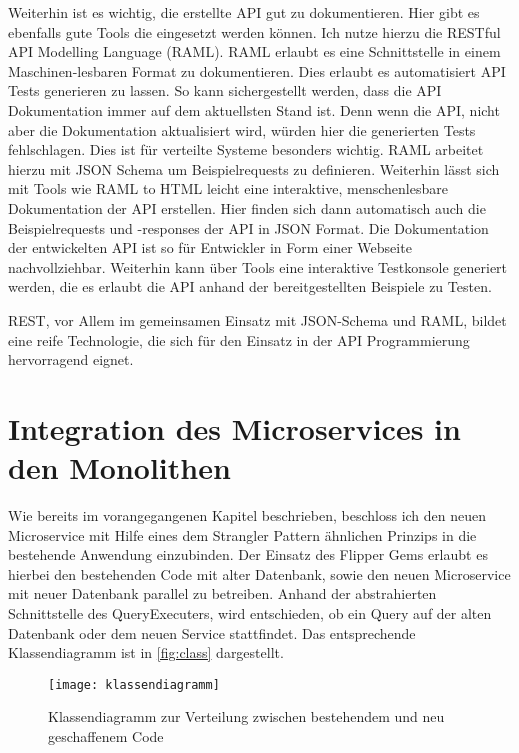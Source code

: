 Weiterhin ist es wichtig, die erstellte API gut zu dokumentieren. Hier gibt es ebenfalls gute Tools die eingesetzt werden können. Ich nutze hierzu die RESTful API Modelling Language (RAML)\cite{raml}. RAML erlaubt es eine Schnittstelle in einem Maschinen-lesbaren Format zu dokumentieren. Dies erlaubt es automatisiert API Tests generieren zu lassen. So kann sichergestellt werden, dass die API Dokumentation immer auf dem aktuellsten Stand ist. Denn wenn die API, nicht aber die Dokumentation aktualisiert wird, würden hier die generierten Tests fehlschlagen. Dies ist für verteilte Systeme besonders wichtig. RAML arbeitet hierzu mit JSON Schema um Beispielrequests zu definieren. Weiterhin lässt sich mit Tools wie RAML to HTML\cite{raml2html} leicht eine interaktive, menschenlesbare Dokumentation der API erstellen. Hier finden sich dann automatisch auch die Beispielrequests und -responses der API in JSON Format. Die Dokumentation der entwickelten API ist so für Entwickler in Form einer Webseite\cite{prophetdoku} nachvollziehbar. 
Weiterhin kann über Tools\cite{ramlconsoletool} eine interaktive Testkonsole generiert werden, die es erlaubt die API anhand der bereitgestellten Beispiele zu Testen.

REST, vor Allem im gemeinsamen Einsatz mit JSON-Schema und RAML, bildet eine reife Technologie, die sich für den Einsatz in der API Programmierung hervorragend eignet.


\section{Integration des Microservices in den Monolithen}
Wie bereits im vorangegangenen Kapitel beschrieben, beschloss ich den neuen Microservice mit Hilfe eines dem Strangler Pattern ähnlichen Prinzips in die bestehende Anwendung einzubinden.
Der Einsatz des Flipper Gems erlaubt es hierbei den bestehenden Code mit alter Datenbank, sowie den neuen Microservice mit neuer Datenbank parallel zu betreiben. Anhand der abstrahierten Schnittstelle des QueryExecuters, wird entschieden, ob ein Query auf der alten Datenbank oder dem neuen Service stattfindet. Das entsprechende Klassendiagramm ist in \autoref{fig:class} dargestellt.
\begin{figure}[!ht]
    \centering
    \caption{Klassendiagramm zur Verteilung zwischen bestehendem und neu geschaffenem Code}
    \label{fig:class}
    \texttt{[image: klassendiagramm]}
\end{figure}

